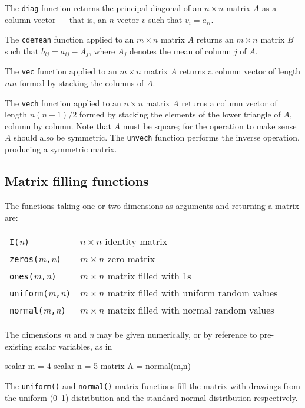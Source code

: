 The \texttt{diag} function returns the principal diagonal of an
$n\times n$ matrix $A$ as a column vector --- that is, an
$n$-vector $v$ such that $v_i = a_{ii}$.

The \texttt{cdemean} function applied to an $m \times n$ matrix $A$
returns an $m \times n$ matrix $B$ such that $b_{ij} = a_{ij} -
\bar{A}_j$, where $\bar{A}_j$ denotes the mean of column $j$ of $A$.  

The \texttt{vec} function applied to an $m \times n$ matrix $A$
returns a column vector of length $mn$ formed by stacking the columns
of $A$.  

The \texttt{vech} function applied to an $n \times n$ matrix $A$
returns a column vector of length $n(n+1)/2$ formed by stacking the
elements of the lower triangle of $A$, column by column.  Note that
$A$ must be square; for the operation to make sense $A$ should also
be symmetric.  The \texttt{unvech} function performs the inverse
operation, producing a symmetric matrix.

\subsection{Matrix filling functions}
\label{matrix-fill}

The functions taking one or two dimensions as arguments and returning
a matrix are:

\begin{center}
\begin{tabular}{ll}
\texttt{I(}\textsl{n}\texttt{)} & $n\times n$ identity matrix \\
\texttt{zeros(}\textsl{m}\texttt{,}\textsl{n}\texttt{)} & 
   $m\times n$ zero matrix \\
\texttt{ones(}\textsl{m}\texttt{,}\textsl{n}\texttt{)} &
   $m\times n$ matrix filled with 1s \\
\texttt{uniform(}\textsl{m}\texttt{,}\textsl{n}\texttt{)} &
   $m\times n$ matrix filled with uniform random values \\
\texttt{normal(}\textsl{m}\texttt{,}\textsl{n}\texttt{)} &
   $m\times n$ matrix filled with normal random values \\
\end{tabular}
\end{center}

The dimensions \textsl{m} and \textsl{n} may be given numerically, or
by reference to pre-existing scalar variables, as in
%
\begin{code}
scalar m = 4
scalar n = 5
matrix A = normal(m,n)
\end{code}
%
The \texttt{uniform()} and \texttt{normal()} matrix functions fill the
matrix with drawings from the uniform (0--1) distribution and the
standard normal distribution respectively.

